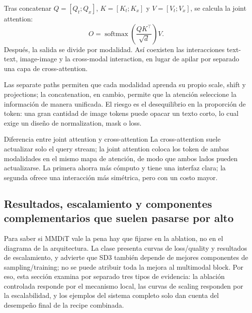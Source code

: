 
Tras concatenar $Q=[Q_t;Q_x]$, $K=[K_t;K_x]$ y $V=[V_t;V_x]$, se calcula la joint attention:
\[
O=\operatorname{softmax}\!\left(\frac{QK^\top}{\sqrt d}\right)V.
\]
Después, la salida se divide por modalidad. Así coexisten las interacciones text-text, image-image y la cross-modal interaction, en lugar de apilar por separado una capa de cross-attention.


Las separate paths permiten que cada modalidad aprenda su propio scale, shift y projections; la concatenation, en cambio, permite que la atención seleccione la información de manera unificada. El riesgo es el desequilibrio en la proporción de token: una gran cantidad de image tokens puede opacar un texto corto, lo cual exige un diseño de normalization, mask o loss.

\begin{knowledgebox}{Diferencia entre joint attention y cross-attention}
La cross-attention suele actualizar solo el query stream; la joint attention coloca los token de ambas modalidades en el mismo mapa de atención, de modo que ambos lados pueden actualizarse. La primera ahorra más cómputo y tiene una interfaz clara; la segunda ofrece una interacción más simétrica, pero con un costo mayor.
\end{knowledgebox}

\subsection{Resultados, escalamiento y componentes complementarios que suelen pasarse por alto}

Para saber si MMDiT vale la pena hay que fijarse en la ablation, no en el diagrama de la arquitectura. La clase presenta curvas de loss/quality y resultados de escalamiento, y advierte que SD3 también depende de mejores componentes de sampling/training; no se puede atribuir toda la mejora al multimodal block. Por eso, esta sección examina por separado tres tipos de evidencia: la ablación controlada responde por el mecanismo local, las curvas de scaling responden por la escalabilidad, y los ejemplos del sistema completo solo dan cuenta del desempeño final de la recipe combinada.

